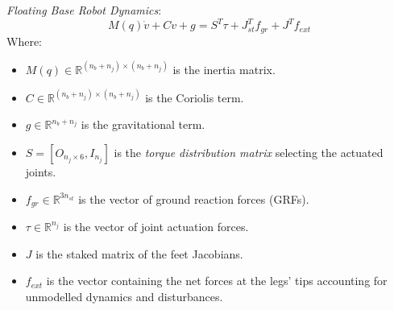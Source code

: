 \begin{definition}
    \textit{Floating Base Robot Dynamics}:
    \begin{equation}\label{legged_robot_dynamic_model}
        M(q)\dot{v}+Cv+g=S^{T}\tau+J_{st}^{T}f_{gr}+J^{T}f_{ext}
    \end{equation}
    Where:
    \begin{itemize}
        \item $M(q)\in\mathbb{R}^{(n_b+n_j)\times(n_b+n_j)}$ is the inertia matrix.
        \item $C\in\mathbb{R}^{(n_b+n_j)\times(n_b+n_j)}$ is the Coriolis term.
        \item $g\in\mathbb{R}^{n_b+n_j}$ is the gravitational term.
        \item $S=[O_{n_j\times6},I_{n_j}]$ is the \textit{torque distribution matrix} selecting the actuated joints.
        \item $f_{gr}\in\mathbb{R}^{3n_{st}}$ is the vector of ground reaction forces (GRFs).
        \item $\tau\in\mathbb{R}^{n_j}$ is the vector of joint actuation forces.
        \item $J$ is the staked matrix of the feet Jacobians.
        \item $f_{ext}$ is the vector containing the net forces at the legs' tips accounting for unmodelled dynamics and disturbances.
    \end{itemize}
\end{definition}
